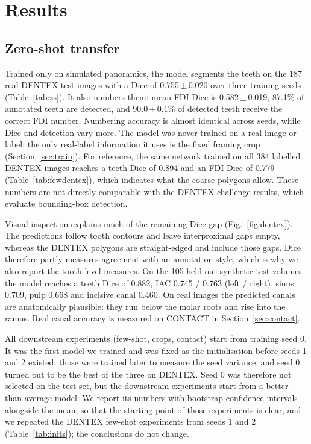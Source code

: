 \documentclass[preprint,12pt]{elsarticle}
\newcommand{\pmsd}[2]{#1\,$\pm$\,#2}
\begin{document}
\section{Results}

\subsection{Zero-shot transfer}
Trained only on simulated panoramics, the model segments the teeth on the 187 real DENTEX test images with a Dice of
\pmsd{0.755}{0.020} over three training seeds (Table~\ref{tab:zs}). It also numbers them: mean FDI Dice is
\pmsd{0.582}{0.019}, 87.1\% of annotated teeth are detected, and \pmsd{90.0}{0.1}\% of detected teeth receive the
correct FDI number. Numbering accuracy is almost identical across seeds, while Dice and detection vary more. The model
was never trained on a real image or label; the only real-label information it uses is the fixed framing crop
(Section~\ref{sec:train}). For reference, the same network trained on all 384 labelled DENTEX images reaches a teeth
Dice of 0.894 and an FDI Dice of 0.779 (Table~\ref{tab:fewdentex}), which indicates what the coarse polygons allow.
These numbers are not directly comparable with the DENTEX challenge results, which evaluate bounding-box detection.

Visual inspection explains much of the remaining Dice gap (Fig.~\ref{fig:dentex}). The predictions follow tooth contours
and leave interproximal gaps empty, whereas the DENTEX polygons are straight-edged and include those gaps. Dice therefore
partly measures agreement with an annotation style, which is why we also report the tooth-level measures. On the 105
held-out synthetic test volumes the model reaches a teeth Dice of 0.882, IAC 0.745 / 0.763 (left / right), sinus 0.709,
pulp 0.668 and incisive canal 0.460. On real images the predicted canals are anatomically plausible: they run below the
molar roots and rise into the ramus. Real canal accuracy is measured on CONTACT in Section~\ref{sec:contact}.

All downstream experiments (few-shot, crops, contact) start from training seed 0. It was the first model we trained and
was fixed as the initialisation before seeds 1 and 2 existed; those were trained later to measure the seed variance,
and seed 0 turned out to be the best of the three on DENTEX. Seed 0 was therefore not selected on the test set, but the
downstream experiments start from a better-than-average model. We report its numbers with bootstrap confidence intervals
alongside the mean, so that the starting point of those experiments is clear, and we repeated the DENTEX few-shot
experiments from seeds 1 and 2 (Table~\ref{tab:inits}); the conclusions do not change.
\end{document}

